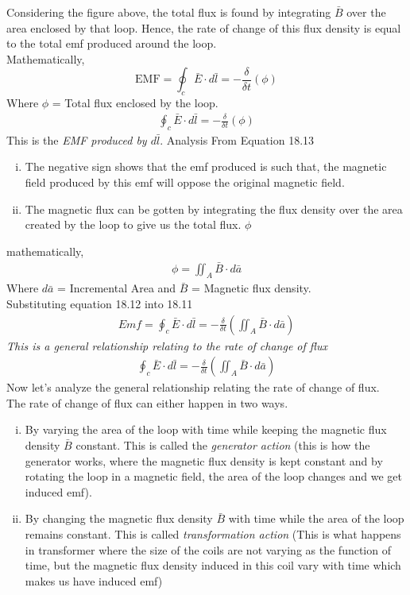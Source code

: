 Considering the figure above, the total flux is found by integrating $\bar{B}$ over the area enclosed by that loop. Hence, the rate of change of this flux density is equal to the total emf produced around the loop.\\
Mathematically,
\begin{dmath}
\text{EMF} = \oint_c\bar{E} \cdot d\bar{l} = -\frac{\delta}{\delta t}(\phi)
\end{dmath}
Where $\phi$ = Total flux enclosed by the loop.
\begin{align}
\boxed{\oint_c\bar{E} \cdot d\bar{l} = -\frac{\delta}{\delta t}(\phi)}
\end{align}
This is the \emph{EMF produced by $d\bar{l}$}. Analysis From Equation 18.13
\begin{enumerate}[(i)]
\item The negative sign shows that the emf produced is such that, the magnetic field produced by this emf will oppose the original magnetic field. 
\item The magnetic flux can be gotten by integrating the flux density over the area created by the loop to give us the total flux. $\phi$ 
\end{enumerate}
mathematically,
\begin{align}
\phi = \iint_A\bar{B} \cdot d\bar{a}
\end{align}
Where $d\bar{a}$ = Incremental Area and $\bar{B}$ = Magnetic flux density.\\
Substituting equation 18.12 into 18.11 
\begin{align*}
\boxed{Emf = \oint_c\bar{E}\cdot d\bar{l} = -\frac{\delta}{\delta t} (\iint_A\bar{B}\cdot d\bar{a})}
\end{align*}
\emph{This is a general relationship relating to the rate of change of flux}	
\begin{align}
\boxed{\oint_c\bar{E}\cdot d\bar{l} = -\frac{\delta}{\delta t} (\iint_A\bar{B}\cdot d\bar{a})}
\end{align} 
Now let's analyze the general relationship relating the rate of change of flux.\\
The rate of change of flux can either happen in two ways.
\begin{enumerate}[(i)]
\item By varying the area of the loop with time while keeping the magnetic flux density $\bar{B}$ constant. This is called the \emph{generator action} (this is how the generator works, where the magnetic flux density is kept constant and by rotating the loop in a magnetic field, the area of the loop changes and we get induced emf).
\item By changing the magnetic flux density $\bar{B}$ with time while the area of the loop remains constant. This is called \emph{transformation action} (This is what happens in transformer where the size of the coils are not varying as the function of time, but the magnetic flux density induced in this coil vary with time which makes us have induced emf)
\end{enumerate}
